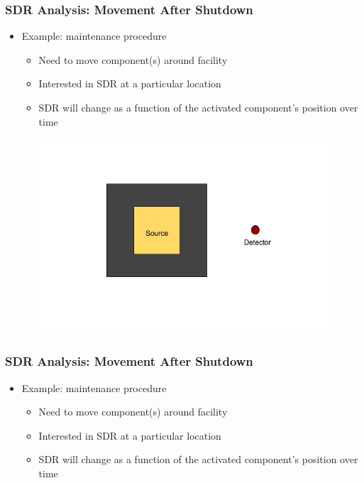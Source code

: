 \documentclass{beamer}
\begin{document}
\begin{frame}
\frametitle{SDR Analysis: Movement After Shutdown}
	\begin{itemize}
		\item{Example: maintenance procedure}
			\begin{itemize}
				\item{Need to move component(s) around facility}
				\item{Interested in SDR at a particular
					location}
				\item{SDR will change as a function of the
					activated component's position over
					time}
			\end{itemize}
	\end{itemize}
        \begin{figure}
        	\centering
        	\includegraphics[scale=0.3]{config-0.jpg}
        \end{figure}

\end{frame}
\begin{frame}
\frametitle{SDR Analysis: Movement After Shutdown}
	\begin{itemize}
		\item{Example: maintenance procedure}
			\begin{itemize}
				\item{Need to move component(s) around facility}
				\item{Interested in SDR at a particular
					location}
				\item{SDR will change as a function of the
					activated component's position over
					time}
			\end{itemize}
	\end{itemize}
	\begin{center}
	\end{center}
\end{frame}
\end{document}
